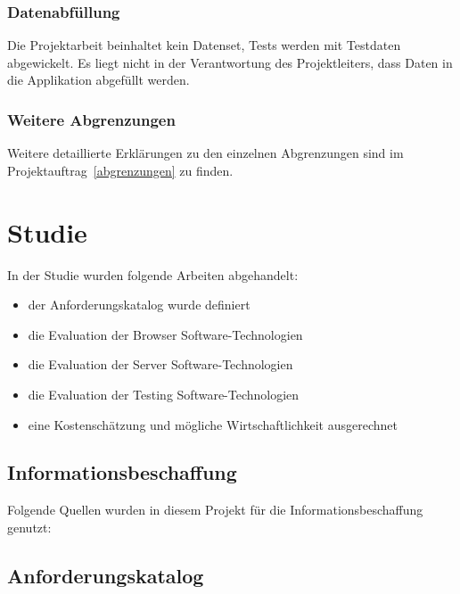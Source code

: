 \subsubsection{Datenabfüllung}\label{datenabfuxfcllung}

Die Projektarbeit beinhaltet kein Datenset, Tests werden mit Testdaten
abgewickelt. Es liegt nicht in der Verantwortung des Projektleiters,
dass Daten in die Applikation abgefüllt werden.

\subsubsection{Weitere Abgrenzungen}

\noindent
Weitere detaillierte Erklärungen zu den einzelnen Abgrenzungen sind im Projektauftrag~\ref{abgrenzungen} zu finden.

\clearpage

\section{Studie}

In der Studie wurden folgende Arbeiten abgehandelt:

\begin{itemize}
  \tightlist
  \item der Anforderungskatalog wurde definiert
  \item die Evaluation der Browser Software-Technologien
  \item die Evaluation der Server Software-Technologien
  \item die Evaluation der Testing Software-Technologien
  \item eine Kostenschätzung und mögliche Wirtschaftlichkeit ausgerechnet
\end{itemize}

\subsection{Informationsbeschaffung}

Folgende Quellen wurden in diesem Projekt für die Informationsbeschaffung
genutzt:



\clearpage
\subsection{Anforderungskatalog}

